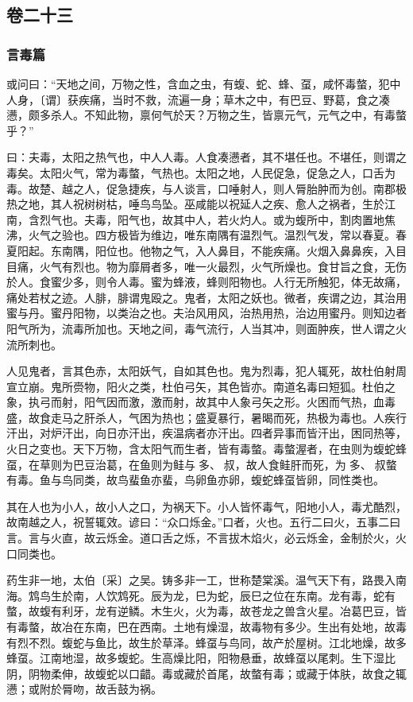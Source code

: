 \documentclass[]{article}
\begin{document}
\hypertarget{header-n819}{%
\subsection{卷二十三}\label{header-n819}}

\hypertarget{header-n820}{%
\subsubsection{言毒篇}\label{header-n820}}

或问曰：``天地之间，万物之性，含血之虫，有蝮、蛇、蜂、虿，咸怀毒螫，犯中人身，〔谓〕获疾痛，当时不救，流遍一身；草木之中，有巴豆、野葛，食之凑懑，颇多杀人。不知此物，禀何气於天？万物之生，皆禀元气，元气之中，有毒螫乎？''

曰：夫毒，太阳之热气也，中人人毒。人食凑懑者，其不堪任也。不堪任，则谓之毒矣。太阳火气，常为毒螫，气热也。太阳之地，人民促急，促急之人，口舌为毒。故楚、越之人，促急捷疾，与人谈言，口唾射人，则人脣胎肿而为创。南郡极热之地，其人祝树树枯，唾鸟鸟坠。巫咸能以祝延人之疾、愈人之祸者，生於江南，含烈气也。夫毒，阳气也，故其中人，若火灼人。或为蝮所中，割肉置地焦沸，火气之验也。四方极皆为维边，唯东南隅有温烈气。温烈气发，常以春夏。春夏阳起。东南隅，阳位也。他物之气，入人鼻目，不能疾痛。火烟入鼻鼻疾，入目目痛，火气有烈也。物为靡屑者多，唯一火最烈，火气所燥也。食甘旨之食，无伤於人。食蜜少多，则令人毒。蜜为蜂液，蜂则阳物也。人行无所触犯，体无故痛，痛处若杖之迹。人腓，腓谓鬼殴之。鬼者，太阳之妖也。微者，疾谓之边，其治用蜜与丹。蜜丹阳物，以类治之也。夫治风用风，治热用热，治边用蜜丹。则知边者阳气所为，流毒所加也。天地之间，毒气流行，人当其冲，则面肿疾，世人谓之火流所刺也。

人见鬼者，言其色赤，太阳妖气，自如其色也。鬼为烈毒，犯人辄死，故杜伯射周宣立崩。鬼所赍物，阳火之类，杜伯弓矢，其色皆亦。南道名毒曰短狐。杜伯之象，执弓而射，阳气因而激，激而射，故其中人象弓矢之形。火困而气热，血毒盛，故食走马之肝杀人，气困为热也；盛夏暴行，暑暍而死，热极为毒也。人疾行汗出，对炉汗出，向日亦汗出，疾温病者亦汗出。四者异事而皆汗出，困同热等，火日之变也。天下万物，含太阳气而生者，皆有毒螫。毒螫渥者，在虫则为蝮蛇蜂虿，在草则为巴豆治葛，在鱼则为鲑与多、叔，故人食鲑肝而死，为多、叔螫有毒。鱼与鸟同类，故鸟蜚鱼亦蜚，鸟卵鱼亦卵，蝮蛇蜂虿皆卵，同性类也。

其在人也为小人，故小人之口，为祸天下。小人皆怀毒气，阳地小人，毒尤酷烈，故南越之人，祝誓辄效。谚曰：``众口烁金。''口者，火也。五行二曰火，五事二曰言。言与火直，故云烁金。道口舌之烁，不言拔木焰火，必云烁金，金制於火，火口同类也。

药生非一地，太伯〔采〕之吴。铸多非一工，世称楚棠溪。温气天下有，路畏入南海。鸩鸟生於南，人饮鸩死。辰为龙，巳为蛇，辰巳之位在东南。龙有毒，蛇有螫，故蝮有利牙，龙有逆鳞。木生火，火为毒，故苍龙之兽含火星。冶葛巴豆，皆有毒螫，故冶在东南，巴在西南。土地有燥湿，故毒物有多少。生出有处地，故毒有烈不烈。蝮蛇与鱼比，故生於草泽。蜂虿与鸟同，故产於屋树。江北地燥，故多蜂虿。江南地湿，故多蝮蛇。生高燥比阳，阳物悬垂，故蜂虿以尾刺。生下湿比阴，阴物柔伸，故蝮蛇以口齰。毒或藏於首尾，故螫有毒；或藏于体肤，故食之辄懑；或附於脣吻，故舌鼓为祸。
\end{document}
